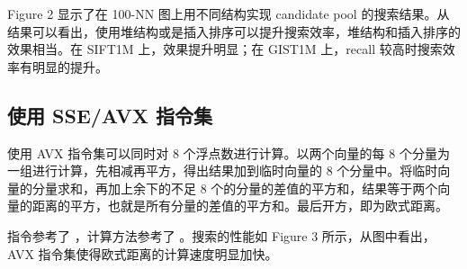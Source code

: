\documentclass{article}
\begin{document}
Figure 2 显示了在 100-NN 图上用不同结构实现 candidate pool 的搜索结果。从结果可以看出，使用堆结构或是插入排序可以提升搜索效率，堆结构和插入排序的效果相当。在 SIFT1M 上，效果提升明显；在 GIST1M 上，recall 较高时搜索效率有明显的提升。

\subsection{使用 SSE/AVX 指令集}
使用 AVX 指令集可以同时对 8 个浮点数进行计算。以两个向量的每 8 个分量为一组进行计算，先相减再平方，得出结果加到临时向量的 8 个分量中。将临时向量的分量求和，再加上余下的不足 8 个的分量的差值的平方和，结果等于两个向量的距离的平方，也就是所有分量的差值的平方和。最后开方，即为欧式距离。

指令参考了 \cite{ref4}，计算方法参考了 \cite{ref5}。搜索的性能如 Figure 3 所示，从图中看出，AVX 指令集使得欧式距离的计算速度明显加快。
\end{document}
